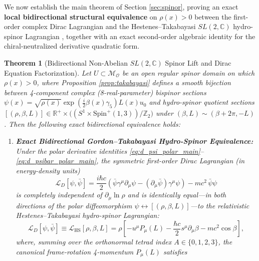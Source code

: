 \documentclass[11pt, a4paper]{article}
\newtheorem{theorem}{Theorem}[section]
\theoremstyle{definition}
\begin{document}
We now establish the main theorem of Section \ref{sec:spinor}, proving an exact \textbf{local bidirectional structural equivalence} on $\rho(x) > 0$ between the first-order complex Dirac Lagrangian and the Hestenes--Takabayasi $SL(2,\mathbb{C})$ hydro-spinor Lagrangian \cite{Takabayasi1952, Hestenes1990}, together with an exact second-order algebraic identity for the chiral-neutralized derivative quadratic form.

\begin{theorem}[Bidirectional Non-Abelian $SL(2,\mathbb{C})$ Spinor Lift and Dirac Equation Factorization]
\label{thm:dirac_lift}
Let $U \subset \mathcal{M}_{\mathcal{O}}$ be an open regular spinor domain on which $\rho(x) > 0$, where Proposition \ref{prop:takabayasi} defines a smooth bijection between 4-component complex (8-real-parameter) bispinor sections $\psi(x) = \sqrt{\rho(x)}\exp(\frac{i}{2}\beta(x)\gamma_5)L(x)u_0$ and hydro-spinor quotient sections $[(\rho, \beta, L)] \in \mathbb{R}^+ \times \big((S^1 \times \text{Spin}^+(1,3))/\mathbb{Z}_2\big)$ under $(\beta, L) \sim (\beta + 2\pi, -L)$. Then the following exact bidirectional equivalence holds:
\begin{enumerate}[label=(\roman*)]
    \item \textbf{Exact Bidirectional Gordon--Takabayasi Hydro-Spinor Equivalence:} Under the polar derivative identities \eqref{eq:d_psi_polar_main}--\eqref{eq:d_psibar_polar_main}, the symmetric first-order Dirac Lagrangian (in energy-density units)
    \begin{equation}
    \label{eq:dirac_lagrangian_sym}
    \mathcal{L}_D[\psi, \bar{\psi}] = \frac{i\hbar c}{2}\left( \bar{\psi}\gamma^\mu \partial_\mu \psi - (\partial_\mu \bar{\psi})\gamma^\mu \psi \right) - mc^2\,\bar{\psi}\psi
    \end{equation}
    is completely independent of $\partial_\mu \ln\rho$ and is identically equal---in both directions of the polar diffeomorphism $\psi \leftrightarrow [(\rho, \beta, L)]$---to the relativistic Hestenes--Takabayasi hydro-spinor Lagrangian:
    \begin{equation}
    \label{eq:dirac_polar_lagrangian_main}
    \mathcal{L}_D[\psi, \bar{\psi}] \equiv \mathcal{L}_{\text{HS}}[\rho, \beta, L] = \rho \left[ -u^\mu P_\mu(L) - \frac{\hbar c}{2} s^\mu \partial_\mu \beta - mc^2 \cos\beta \right],
    \end{equation}
    where, summing over the orthonormal tetrad index $A \in \{0,1,2,3\}$, the canonical frame-rotation 4-momentum $P_\mu(L)$ satisfies
    \begin{equation}

\end{equation}
\end{enumerate}
\end{theorem}
\end{document}

